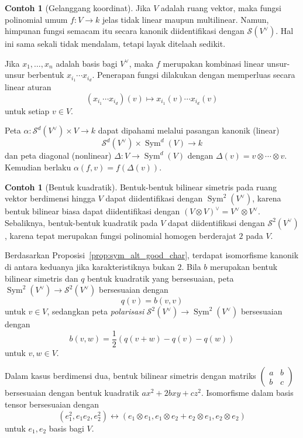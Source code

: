 \documentclass[12pt]{article}
\theoremstyle{plain}
\theoremstyle{definition}
\newtheorem{example}[theorem]{Contoh}
\theoremstyle{remark}
\numberwithin{equation}{section}
\begin{document}
\begin{example}[Gelanggang koordinat]
Jika $V$ adalah ruang vektor, maka fungsi polinomial umum $f: V \to k$
jelas tidak linear maupun multilinear. Namun, himpunan fungsi
semacam itu secara kanonik diidentifikasi dengan $\mathcal{S}(V^\vee)$.
Hal ini sama sekali tidak mendalam, tetapi layak ditelaah sedikit.

Jika $x_1,\ldots,x_n$ adalah basis bagi $V^\vee$, maka
$f$ merupakan kombinasi linear unsur-unsur berbentuk
$x_{i_1}\cdots x_{i_d}$. Penerapan fungsi dilakukan
dengan memperluas secara linear aturan
\[
(x_{i_1}\cdots x_{i_d})(v) \mapsto x_{i_1}(v)\cdots x_{i_d}(v)
\]
untuk setiap $v \in V$.

Peta $\alpha : \mathcal{S}^d(V^\vee) \times V \to k$
dapat dipahami melalui pasangan kanonik (linear)
\[
\mathcal{S}^d(V^\vee) \times \operatorname{Sym}^d(V) \to k
\]
dan peta diagonal (nonlinear)
$\Delta: V \to \operatorname{Sym}^d(V)$
dengan $\Delta(v) = v \otimes \cdots \otimes v$.
Kemudian berlaku $\alpha(f,v) = f(\Delta(v))$.
\end{example}

\begin{example}[Bentuk kuadratik]
Bentuk-bentuk bilinear simetris pada ruang vektor berdimensi hingga $V$
dapat diidentifikasi dengan $\operatorname{Sym}^2(V^\vee)$, karena bentuk
bilinear biasa dapat diidentifikasi dengan
$(V \otimes V)^\vee=V^\vee \otimes V^\vee$.
Sebaliknya, bentuk-bentuk kuadratik pada $V$ dapat diidentifikasi dengan
$\mathcal{S}^2(V^\vee)$, karena tepat merupakan fungsi polinomial homogen berderajat $2$
pada $V$.

Berdasarkan Proposisi~\ref{prop:sym_alt_good_char},
terdapat isomorfisme kanonik di antara keduanya jika karakteristiknya
bukan $2$. Bila $b$ merupakan bentuk bilinear
simetris dan $q$ bentuk kuadratik yang bersesuaian,
peta $\operatorname{Sym}^2(V^\vee) \to \mathcal{S}^2(V^\vee)$
bersesuaian dengan
\[
q(v) = b(v,v)
\]
untuk $v\in V$, sedangkan peta \emph{polarisasi}
$\mathcal{S}^2(V^\vee) \to \operatorname{Sym}^2(V^\vee)$
bersesuaian dengan
\[
b(v,w) = \frac{1}{2}\left( q(v+w)-q(v)-q(w)\right)
\]
untuk $v,w \in V$.

Dalam kasus berdimensi dua,
bentuk bilinear simetris dengan matriks
$\begin{pmatrix} a & b\\ b&c \end{pmatrix}$ bersesuaian dengan bentuk kuadratik
$ax^2+2bxy+cz^2$. Isomorfisme dalam basis tensor bersesuaian dengan
\[
(e_1^2, e_1e_2, e_2^2) \leftrightarrow
(e_1 \otimes e_1, e_1 \otimes e_2 + e_2 \otimes e_1, e_2 \otimes e_2)
\]
untuk $e_1, e_2$ basis bagi $V$.
\end{example}
\end{document}
